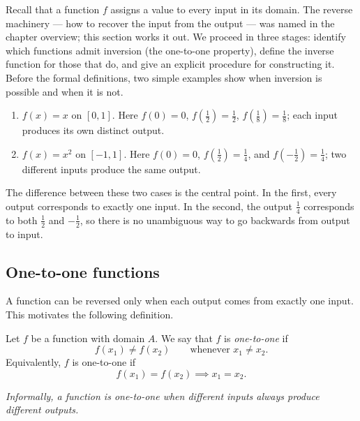 Recall that a function \(f\) assigns a value to every input in its domain. The reverse machinery --- how to recover the input from the output --- was named in the chapter overview; this section works it out. We proceed in three stages: identify which functions admit inversion (the one-to-one property), define the inverse function for those that do, and give an explicit procedure for constructing it. Before the formal definitions, two simple examples show when inversion is possible and when it is not.

\begin{enumerate}
    \item \(f(x) = x\) on \([0, 1]\). Here \(f(0) = 0\), \(f(\tfrac{1}{2}) = \tfrac{1}{2}\), \(f(\tfrac{1}{8}) = \tfrac{1}{8}\); each input produces its own distinct output.
    \item \(f(x) = x^{2}\) on \([-1, 1]\). Here \(f(0) = 0\), \(f(\tfrac{1}{2}) = \tfrac{1}{4}\), and \(f(-\tfrac{1}{2}) = \tfrac{1}{4}\); two different inputs produce the same output.
\end{enumerate}

The difference between these two cases is the central point. In the first, every output corresponds to exactly one input. In the second, the output \(\tfrac{1}{4}\) corresponds to both \(\tfrac{1}{2}\) and \(-\tfrac{1}{2}\), so there is no unambiguous way to go backwards from output to input.

\subsection{One-to-one functions}

A function can be reversed only when each output comes from exactly one input. This motivates the following definition.

\begin{definition}
Let \(f\) be a function with domain \(A\). We say that \(f\) is \emph{one-to-one} if
\[
f(x_{1}) \neq f(x_{2}) \qquad \text{whenever } x_{1} \neq x_{2}.
\]
Equivalently, \(f\) is one-to-one if
\[
f(x_{1}) = f(x_{2}) \implies x_{1} = x_{2}.
\]

\emph{Informally, a function is one-to-one when different inputs always produce different outputs.}
\end{definition}

